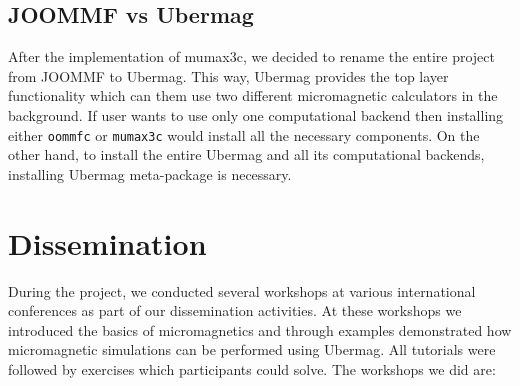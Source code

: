 \documentclass{deliverablereport}
\begin{document}
\subsection{JOOMMF vs Ubermag}

After the implementation of mumax3c, we decided to rename the entire project from JOOMMF to Ubermag. This way, Ubermag provides the top layer functionality which can them use two different micromagnetic calculators in the background. If user wants to use only one computational backend then installing either \texttt{oommfc} or \texttt{mumax3c} would install all the necessary components. On the other hand, to install the entire Ubermag and all its computational backends, installing Ubermag meta-package is necessary.

\section{Dissemination}

During the project, we conducted several workshops at various international conferences as part of our dissemination activities. At these workshops we introduced the basics of micromagnetics and through examples demonstrated how micromagnetic simulations can be performed using Ubermag. All tutorials were followed by exercises which participants could solve. The workshops we did are:
\end{document}
